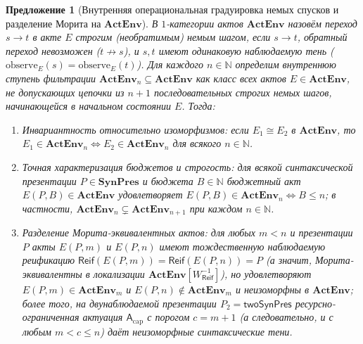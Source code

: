 \documentclass[11pt]{article}
\theoremstyle{plain}
\newtheorem{proposition}[theorem]{Предложение}
\theoremstyle{definition}
\begin{document}
\begin{proposition}[Внутренняя операциональная градуировка немых спусков и разделение Морита на $\mathbf{ActEnv}$]\label{prop:resource-grading-model}
В $1$-категории актов $\mathbf{ActEnv}$ назовём переход $s \to t$ в акте $E$ \emph{строгим (необратимым) немым шагом}, если $s \to t$, обратный переход невозможен ($t \not\to s$), и $s, t$ имеют одинаковую наблюдаемую тень ($\mathrm{observe}_E(s) = \mathrm{observe}_E(t)$). Для каждого $n \in \mathbb{N}$ определим внутреннюю ступень фильтрации $\mathbf{ActEnv}_n \subseteq \mathbf{ActEnv}$ как класс всех актов $E \in \mathbf{ActEnv}$, не допускающих цепочки из $n+1$ последовательных строгих немых шагов, начинающейся в начальном состоянии $E$. Тогда:
\begin{enumerate}[nosep,label=(\roman*)]
\item \emph{Инвариантность относительно изоморфизмов}: если $E_1 \cong E_2$ в $\mathbf{ActEnv}$, то $E_1 \in \mathbf{ActEnv}_n \iff E_2 \in \mathbf{ActEnv}_n$ для всякого $n \in \mathbb{N}$.
\item \emph{Точная характеризация бюджетов и строгость}: для всякой синтаксической презентации $P \in \mathbf{SynPres}$ и бюджета $B \in \mathbb{N}$ бюджетный акт $E(P, B) \in \mathbf{ActEnv}$ удовлетворяет $E(P, B) \in \mathbf{ActEnv}_n \iff B \le n$; в частности, $\mathbf{ActEnv}_n \subsetneq \mathbf{ActEnv}_{n+1}$ при каждом $n \in \mathbb{N}$.
\item \emph{Разделение Морита-эквивалентных актов}: для любых $m < n$ и презентации $P$ акты $E(P, m)$ и $E(P, n)$ имеют тождественную наблюдаемую реификацию $\mathsf{Reif}(E(P, m)) = \mathsf{Reif}(E(P, n)) = P$ (а значит, Морита-эквивалентны в локализации $\mathbf{ActEnv}[W_{\mathsf{Reif}}^{-1}]$), но удовлетворяют $E(P, m) \in \mathbf{ActEnv}_m$ и $E(P, n) \notin \mathbf{ActEnv}_m$ и неизоморфны в $\mathbf{ActEnv}$; более того, на двунаблюдаемой презентации $P_2 = \mathsf{twoSynPres}$ ресурсно-ограниченная актуация $\mathsf{A}_{\mathrm{cap}}$ с порогом $c = m + 1$ (а следовательно, и с любым $m < c \le n$) даёт неизоморфные синтаксические тени.
\end{enumerate}
\end{proposition}
\end{document}
